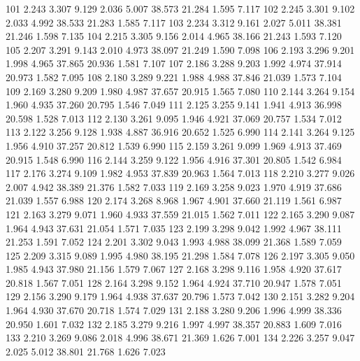 \documentclass[a4paper,11pt]{scrartcl}
\begin{document}
\begin{Schunk}
\begin{Soutput}
101  2.243  3.307    9.129     2.036  5.007   38.573   21.284    1.595  7.117
102  2.245  3.301    9.102     2.033  4.992   38.533   21.283    1.585  7.117
103  2.234  3.312    9.161     2.027  5.011   38.381   21.246    1.598  7.135
104  2.215  3.305    9.156     2.014  4.965   38.166   21.243    1.593  7.120
105  2.207  3.291    9.143     2.010  4.973   38.097   21.249    1.590  7.098
106  2.193  3.296    9.201     1.998  4.965   37.865   20.936    1.581  7.107
107  2.186  3.288    9.203     1.992  4.974   37.914   20.973    1.582  7.095
108  2.180  3.289    9.221     1.988  4.988   37.846   21.039    1.573  7.104
109  2.169  3.280    9.209     1.980  4.987   37.657   20.915    1.565  7.080
110  2.144  3.264    9.154     1.960  4.935   37.260   20.795    1.546  7.049
111  2.125  3.255    9.141     1.941  4.913   36.998   20.598    1.528  7.013
112  2.130  3.261    9.095     1.946  4.921   37.069   20.757    1.534  7.012
113  2.122  3.256    9.128     1.938  4.887   36.916   20.652    1.525  6.990
114  2.141  3.264    9.125     1.956  4.910   37.257   20.812    1.539  6.990
115  2.159  3.261    9.099     1.969  4.913   37.469   20.915    1.548  6.990
116  2.144  3.259    9.122     1.956  4.916   37.301   20.805    1.542  6.984
117  2.176  3.274    9.109     1.982  4.953   37.839   20.963    1.564  7.013
118  2.210  3.277    9.026     2.007  4.942   38.389   21.376    1.582  7.033
119  2.169  3.258    9.023     1.970  4.919   37.686   21.039    1.557  6.988
120  2.174  3.268    8.968     1.967  4.901   37.660   21.119    1.561  6.987
121  2.163  3.279    9.071     1.960  4.933   37.559   21.015    1.562  7.011
122  2.165  3.290    9.087     1.964  4.943   37.631   21.054    1.571  7.035
123  2.199  3.298    9.042     1.992  4.967   38.111   21.253    1.591  7.052
124  2.201  3.302    9.043     1.993  4.988   38.099   21.368    1.589  7.059
125  2.209  3.315    9.089     1.995  4.980   38.195   21.298    1.584  7.078
126  2.197  3.305    9.050     1.985  4.943   37.980   21.156    1.579  7.067
127  2.168  3.298    9.116     1.958  4.920   37.617   20.818    1.567  7.051
128  2.164  3.298    9.152     1.964  4.924   37.710   20.947    1.578  7.051
129  2.156  3.290    9.179     1.964  4.938   37.637   20.796    1.573  7.042
130  2.151  3.282    9.204     1.964  4.930   37.670   20.718    1.574  7.029
131  2.188  3.280    9.206     1.996  4.999   38.336   20.950    1.601  7.032
132  2.185  3.279    9.216     1.997  4.997   38.357   20.883    1.609  7.016
133  2.210  3.269    9.086     2.018  4.996   38.671   21.369    1.626  7.001
134  2.226  3.257    9.047     2.025  5.012   38.801   21.768    1.626  7.023

\end{Soutput}
\end{Schunk}
\end{document}
